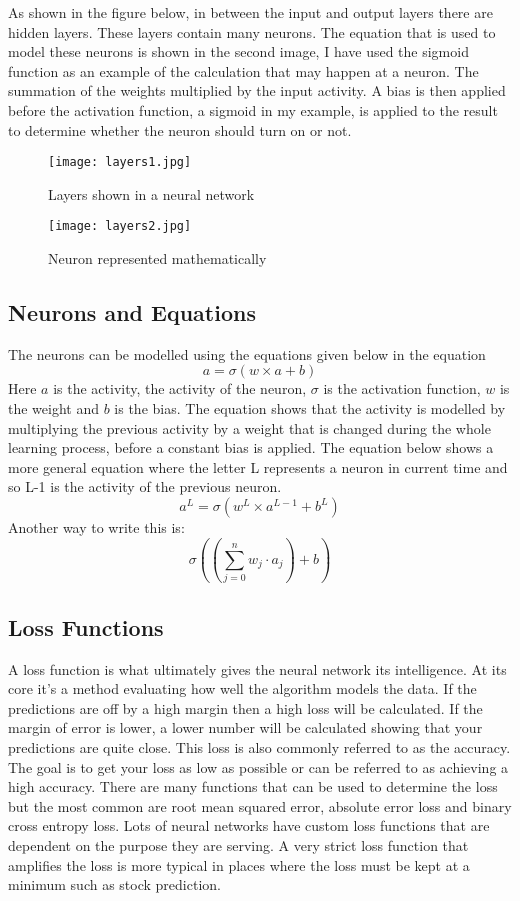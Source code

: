 \documentclass{article}
\begin{document}
As shown in the figure below, in between the input and output layers there are hidden layers.  These layers contain many neurons. The equation that is used to model these neurons is shown in the second image, I have used the sigmoid function as an example of the calculation that may happen at a neuron. The summation of the weights multiplied by the input activity. A bias is then applied before the activation function, a sigmoid in my example, is applied to the result to determine whether the neuron should turn on or not.
\begin{figure*}[h!]
            \centering
            \texttt{[image: layers1.jpg]}
            \caption{Layers shown in a neural network}
        \end{figure*}
\begin{figure}[h!]
            \centering
            \texttt{[image: layers2.jpg]}
            \caption{Neuron represented mathematically}
        \end{figure}

\subsection{Neurons and Equations}
The neurons can be modelled using the equations given below in the equation $$a = \sigma(w \times a + b)$$
Here $a$ is the activity, the activity of the neuron, $\sigma$ is the activation function, $w$ is the weight and $b$ is the bias.
The equation shows that the activity is modelled by multiplying the previous activity by a weight that is changed during the whole learning process, before a constant bias is applied. The equation below shows a more general equation where the letter L represents a neuron in current time and so L-1 is the activity of the previous neuron.
$$a^{L} = \sigma(w^{L}\times a^{L-1} + b^{L})$$
Another way to write this is:\\
$$\sigma((\sum_{j=0}^{n}w_j\cdot a_j)+b)$$

\subsection{Loss Functions}

A loss function is what ultimately gives the neural network its intelligence. At its core it’s a method evaluating how well the algorithm models the data. If the predictions are off by a high margin then a high loss will be calculated. If the margin of error is lower, a lower number will be calculated showing that your predictions are quite close. This loss is also commonly referred to as the accuracy. The goal is to get your loss as low as possible or can be referred to as achieving a high accuracy.  There are many functions that can be used to determine the loss but the most common are root mean squared error, absolute error loss and binary cross entropy loss. Lots of neural networks have custom loss functions that are dependent on the purpose they are serving. A very strict loss function that amplifies the loss is more typical in places where the loss must be kept at a minimum such as stock prediction.
\end{document}
